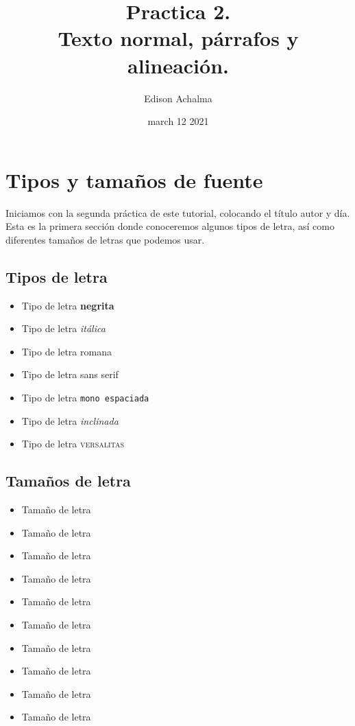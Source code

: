 \documentclass[12pt]{article}
\begin{document}
\title{Practica 2. \\ Texto normal, párrafos y alineación.}
\author{Edison Achalma}
\date{march 12 2021}
\maketitle
\tableofcontents

\section{Tipos y tamaños de fuente}

Iniciamos con la segunda práctica de este tutorial, colocando el título autor y día. Esta es la primera sección donde conoceremos algunos tipos de letra, así como diferentes tamaños de letras que podemos usar.

\subsection{Tipos de letra}

\begin{itemize}
\item Tipo de letra \textbf{negrita}
\item Tipo de letra \textit{itálica}
\item Tipo de letra \textrm{romana}
\item Tipo de letra \textsf{sans serif}
\item Tipo de letra \texttt{mono espaciada}
\item Tipo de letra \textsl{inclinada}
\item Tipo de letra \textsc{versalitas}
\end{itemize}

\newpage %

\subsection{Tamaños de letra}

\begin{itemize}
\item {\tiny Tamaño} de letra
\item {\scriptsize Tamaño} de letra
\item {\footnotesize Tamaño} de letra
\item {\small Tamaño} de letra
\item {\normalsize Tamaño} de letra
\item {\large Tamaño} de letra
\item {\Large Tamaño} de letra
\item {\LARGE Tamaño} de letra
\item {\huge Tamaño} de letra
\item {\huge Tamaño} de letra
\end{itemize}
\end{document}
